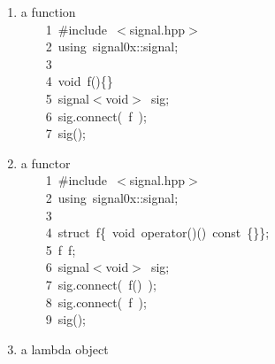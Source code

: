 \documentclass[9pt,onside,a4paper]{article}
\newcommand{\hlstd}[1]{\textcolor[rgb]{0.2,0,0.4}{#1}}
\newcommand{\hlppc}[1]{\textcolor[rgb]{0.33,0.45,0.69}{#1}}
\newcommand{\hlopt}[1]{\textcolor[rgb]{0.33,0.33,0.33}{#1}}
\newcommand{\hllin}[1]{\textcolor[rgb]{0.6,0.6,0.6}{#1}}
\newcommand{\hlkwa}[1]{\textcolor[rgb]{1,0.19,0.19}{#1}}
\newcommand{\hlkwb}[1]{\textcolor[rgb]{0.96,0.55,0.14}{#1}}
\newcommand{\hlkwc}[1]{\textcolor[rgb]{0,0,1}{#1}}
\newcommand{\hlkwd}[1]{\textcolor[rgb]{0.82,0.11,0.93}{#1}}
\begin{document}
\begin{enumerate}

\item a function \\

\noindent
\ttfamily
\hlstd{}\hllin{\ \ \ \ 1\ }\hlppc{\#include\ $<$signal.hpp$>$}\\
\hllin{\ \ \ \ 2\ }\hlstd{}\hlkwa{using\ }\hlstd{signal0x}\hlopt{::}\hlstd{signal}\hlopt{;}\\
\hllin{\ \ \ \ 3\ }\hlstd{}\\
\hllin{\ \ \ \ 4\ }\hlkwb{void\ }\hlstd{}\hlkwd{f}\hlstd{}\hlopt{()\{\}}\\
\hllin{\ \ \ \ 5\ }\hlstd{signal}\hlopt{$<$}\hlstd{}\hlkwb{void}\hlstd{}\hlopt{$>$\ }\hlstd{sig}\hlopt{;}\\
\hllin{\ \ \ \ 6\ }\hlstd{sig}\hlopt{.}\hlstd{}\hlkwd{connect}\hlstd{}\hlopt{(\ }\hlstd{f\ }\hlopt{);}\\
\hllin{\ \ \ \ 7\ }\hlstd{}\hlkwd{sig}\hlstd{}\hlopt{();}\hlstd{}\\
\mbox{}
\normalfont
\normalsize

\item a functor \\

\noindent
\ttfamily
\hlstd{}\hllin{\ \ \ \ 1\ }\hlppc{\#include\ $<$signal.hpp$>$}\\
\hllin{\ \ \ \ 2\ }\hlstd{}\hlkwa{using\ }\hlstd{signal0x}\hlopt{::}\hlstd{signal}\hlopt{;}\\
\hllin{\ \ \ \ 3\ }\hlstd{}\\
\hllin{\ \ \ \ 4\ }\hlkwb{struct\ }\hlstd{f}\hlopt{\{\ }\hlstd{}\hlkwb{void\ }\hlstd{}\hlkwc{operator}\hlstd{}\hlopt{()()\ }\hlstd{}\hlkwb{const\ }\hlstd{}\hlopt{\{\}\};}\\
\hllin{\ \ \ \ 5\ }\hlstd{f\ f\textunderscore }\hlopt{;}\\
\hllin{\ \ \ \ 6\ }\hlstd{signal}\hlopt{$<$}\hlstd{}\hlkwb{void}\hlstd{}\hlopt{$>$\ }\hlstd{sig}\hlopt{;}\\
\hllin{\ \ \ \ 7\ }\hlstd{sig}\hlopt{.}\hlstd{}\hlkwd{connect}\hlstd{}\hlopt{(\ }\hlstd{}\hlkwd{f}\hlstd{}\hlopt{()\ );}\\
\hllin{\ \ \ \ 8\ }\hlstd{sig}\hlopt{.}\hlstd{}\hlkwd{connect}\hlstd{}\hlopt{(\ }\hlstd{f\textunderscore \ }\hlopt{);}\\
\hllin{\ \ \ \ 9\ }\hlstd{}\hlkwd{sig}\hlstd{}\hlopt{();}\hlstd{}\\
\mbox{}
\normalfont
\normalsize


\item a lambda object \\


\end{enumerate}
\end{document}
